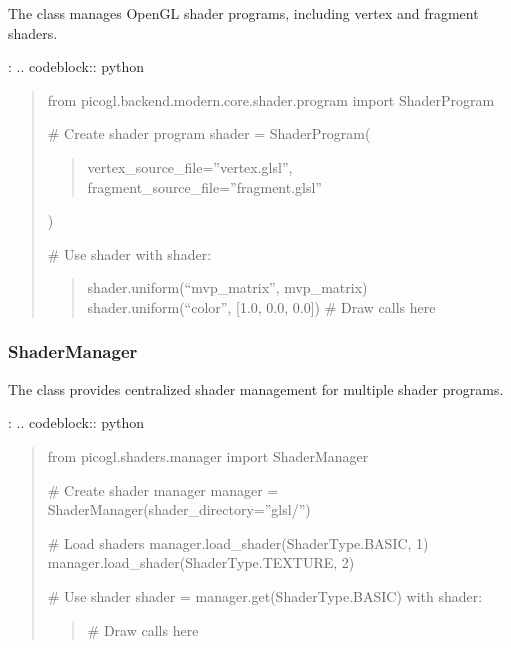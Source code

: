 \documentclass[a4paper,10pt,english,openany,oneside]{sphinxmanual}
\begin{document}
\sphinxAtStartPar
The  class manages OpenGL shader programs, including vertex and fragment shaders.

\sphinxAtStartPar
{}:
.. code\sphinxhyphen{}block:: python
\begin{quote}

\sphinxAtStartPar
from picogl.backend.modern.core.shader.program import ShaderProgram

\sphinxAtStartPar
\# Create shader program
shader = ShaderProgram(
\begin{quote}

\sphinxAtStartPar
vertex\_source\_file=”vertex.glsl”,
fragment\_source\_file=”fragment.glsl”
\end{quote}

\sphinxAtStartPar
)

\sphinxAtStartPar
\# Use shader
with shader:
\begin{quote}

\sphinxAtStartPar
shader.uniform(“mvp\_matrix”, mvp\_matrix)
shader.uniform(“color”, {[}1.0, 0.0, 0.0{]})
\# Draw calls here
\end{quote}
\end{quote}


\subsubsection{ShaderManager}
\label{\detokenize{api/shaders:shadermanager}}
\sphinxAtStartPar
The  class provides centralized shader management for multiple shader programs.

\sphinxAtStartPar
{}:
.. code\sphinxhyphen{}block:: python
\begin{quote}

\sphinxAtStartPar
from picogl.shaders.manager import ShaderManager

\sphinxAtStartPar
\# Create shader manager
manager = ShaderManager(shader\_directory=”glsl/”)

\sphinxAtStartPar
\# Load shaders
manager.load\_shader(ShaderType.BASIC, 1)
manager.load\_shader(ShaderType.TEXTURE, 2)

\sphinxAtStartPar
\# Use shader
shader = manager.get(ShaderType.BASIC)
with shader:
\begin{quote}

\sphinxAtStartPar
\# Draw calls here
\end{quote}
\end{quote}
\end{document}
